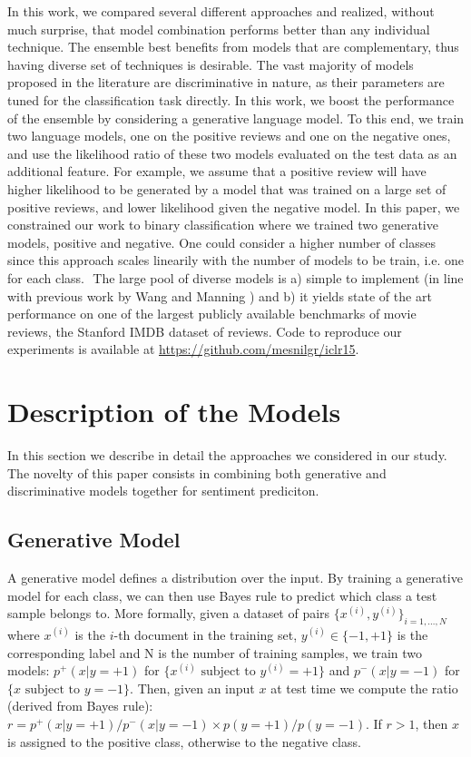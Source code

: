 \documentclass{article} %
\begin{document}
In this work, we compared several different approaches and realized, without
much surprise, that model combination performs better than any individual
technique. The ensemble best benefits from models that are complementary, thus
having diverse set of techniques is desirable. The vast majority of models
proposed in the literature are discriminative in nature, as their parameters
are tuned for the classification task directly. In this work, we boost the
performance of the ensemble by considering a generative language model. To this
end, we train two language models, one on the positive reviews and one on the
negative ones, and use the likelihood ratio of these two models evaluated on
the test data as an additional feature. For example, we assume that a positive
review will have higher likelihood to be generated by a model that was trained
on a large set of positive reviews, and lower likelihood given the negative
model. In this paper, we constrained our work to binary classification where we
trained two generative models, positive and negative. One could consider a
higher number of classes since this approach scales linearily with the number
of models to be train, i.e. one for each class.   The large pool of diverse
models is a) simple to implement (in line with previous work by Wang and
Manning \citep{Wang2012}) and b) it yields state of the art performance on
one of the largest publicly available benchmarks of movie reviews, the Stanford
IMDB dataset of reviews. Code to reproduce our experiments is available at
\url{https://github.com/mesnilgr/iclr15}.

\section{Description of the Models}

In this section we describe in detail the approaches we considered in our
study. The novelty of this paper consists in combining both generative and
discriminative models together for sentiment prediciton. 

\subsection{Generative Model}

A generative model defines a distribution over the input. By training a
generative model for each class, we can then use Bayes rule to predict which
class a test sample belongs to. More formally, given a dataset of pairs $\{x^{(i)},
y^{(i)}\}_{i=1,\dots, N}$ where $x^{(i)}$ is the $i$-th document in the training set, $y^{(i)} \in
\{-1,+1\}$ is the corresponding label and N is the number of training samples, we
train two models: $p^{+}(x | y = +1)$ for $\{x^{(i)} \textrm{~subject to~} y^{(i)} = +1\}$ and $p^{-}(x | y = -1)$ for
$\{x \textrm{~subject to~} y = -1\}$. Then, given an input $x$ at test time we compute the ratio
(derived from Bayes rule): $r =  p^{+}(x | y = +1) / p^{-}(x | y = -1) \times p(y = +1) /
p(y = -1)$. If $r > 1$, then $x$ is assigned to the positive class, otherwise to the
negative class.
\end{document}
